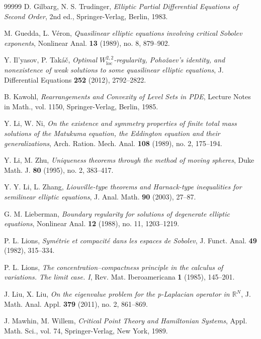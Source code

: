 \documentclass[12pt,reqno]{amsart}
\begin{document}
\begin{thebibliography}{99999}
 D. Gilbarg, N. S. Trudinger, \textit{Elliptic Partial Differential Equations of Second Order}, 2nd ed., Springer-Verlag, Berlin, 1983.

 M. Guedda, L. Véron, \textit{Quasilinear elliptic equations involving critical Sobolev exponents}, Nonlinear Anal. \textbf{13} (1989), no. 8, 879–902.

 Y. Il’yasov, P. Takáč, \textit{Optimal \(W^{2,2}_{\mathrm{loc}}\)-regularity, Pohožaev’s identity, and nonexistence of weak solutions to some quasilinear elliptic equations}, J. Differential Equations \textbf{252} (2012), 2792–2822.

 B. Kawohl, \textit{Rearrangements and Convexity of Level Sets in PDE}, Lecture Notes in Math., vol. 1150, Springer-Verlag, Berlin, 1985.

 Y. Li, W. Ni, \textit{On the existence and symmetry properties of finite total mass solutions of the Matukuma equation, the Eddington equation and their generalizations}, Arch. Ration. Mech. Anal. \textbf{108} (1989), no. 2, 175–194.

 Y. Li, M. Zhu, \textit{Uniqueness theorems through the method of moving spheres}, Duke Math. J. \textbf{80} (1995), no. 2, 383–417.

 Y. Y. Li, L. Zhang, \textit{Liouville-type theorems and Harnack-type inequalities for semilinear elliptic equations}, J. Anal. Math. \textbf{90} (2003), 27–87.

 G. M. Lieberman, \textit{Boundary regularity for solutions of degenerate elliptic equations}, Nonlinear Anal. \textbf{12} (1988), no. 11, 1203–1219.

 P. L. Lions, \textit{Symétrie et compacité dans les espaces de Sobolev}, J. Funct. Anal. \textbf{49} (1982), 315–334.

 P. L. Lions, \textit{The concentration–compactness principle in the calculus of variations. The limit case. I}, Rev. Mat. Iberoamericana \textbf{1} (1985), 145–201.

 J. Liu, X. Liu, \textit{On the eigenvalue problem for the p-Laplacian operator in \(\mathds{R}^N\)}, J. Math. Anal. Appl. \textbf{379} (2011), no. 2, 861–869.

 J. Mawhin, M. Willem, \textit{Critical Point Theory and Hamiltonian Systems}, Appl. Math. Sci., vol. 74, Springer-Verlag, New York, 1989.


\end{thebibliography}
\end{document}
